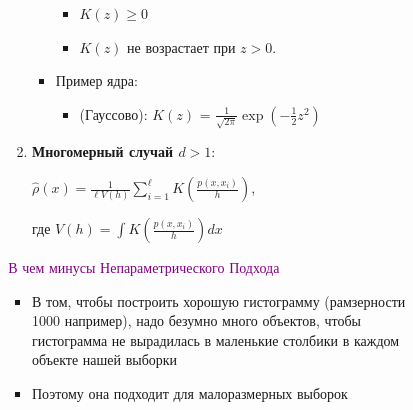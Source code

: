 \begin{enumerate}
\begin{enumerate}
\begin{itemize}
\begin{itemize}
\begin{enumerate}
\begin{itemize}
\begin{itemize}
                                            \item $K(z) \geq 0$
                                            \item $K(z)$ не возрастает при $z > 0$.
                                        \end{itemize}

                                        \item Пример ядра:
                                        \begin{itemize}
                                            \item (Гауссово): $K(z)$ = $\frac{1}{\sqrt{2\pi}} \exp(- \frac{1}{2}z^2)$
                                        \end{itemize}
                                    \end{itemize}

                                    \item \textbf{Многомерный случай $d > 1$}:
                                        \begin{center}
                                        \Large
                                            $\hat{\rho}(x) = \frac{1}{\ell V(h)} \sum\limits_{i = 1}^\ell K(\frac{p(x, x_i)}{h})$,
                                        \end{center}
                                        где $V(h) = \int K(\frac{p(x, x_i)}{h}) dx$\\

                                \end{enumerate}

                                \textcolor{purple}{В чем минусы Непараметрического Подхода}
                                \begin{itemize}
                                    \item В том, чтобы построить хорошую гистограмму (рамзерности 1000 например), надо безумно много объектов, чтобы гистограмма не вырадилась в маленькие столбики в каждом объекте нашей выборки 

                                    \item Поэтому она подходит для малоразмерных выборок
                                \end{itemize}
                         \end{itemize}
                     \end{itemize}


\end{enumerate}
\end{enumerate}
